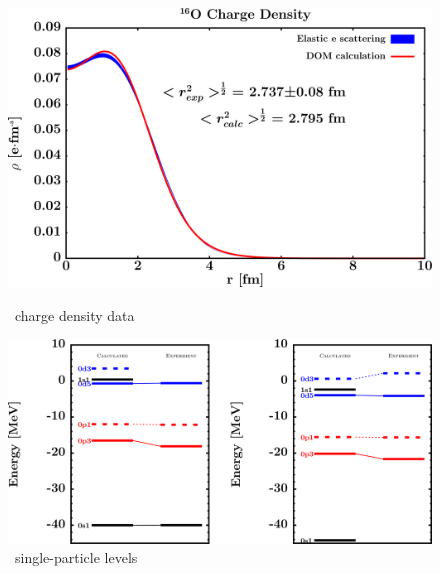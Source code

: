 \begin{figure}[H]
    \centering
    \begin{minipage}{0.45\textwidth}
        \centering
        \includegraphics[width=1.0\textwidth]{figures/o16_chargeDensity.png}
        \caption{\oSix\ charge density data}
        \label{DOMFitData_o16_chargeDensity}
    \end{minipage}\hfill
    \begin{minipage}{0.45\textwidth}
        \centering
        \includegraphics[width=1.0\textwidth]{figures/o16_SPLevels.png}
        \caption{\oSix\ single-particle levels}
        \label{DOMFitData_o16_SPLevels}
    \end{minipage}
\end{figure}

\afterpage{\clearpage}

